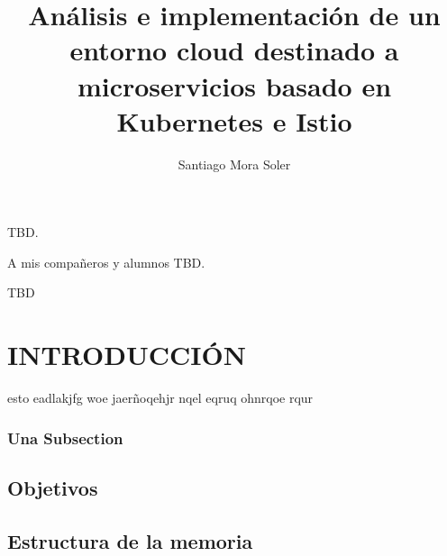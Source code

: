 \documentclass[spanish,twoside,12pt,a4paper]{book}
\title{Análisis e implementación de un entorno cloud destinado a microservicios basado en Kubernetes e Istio}
\author{Santiago Mora Soler}
\begin{document}
\renewcommand\tablename{Tabla}
\renewcommand\listtablename{ÍNDICE DE TABLAS}

\renewcommand\listfigurename{ÍNDICE DE FIGURAS}

\cosupervisor{}

\maketitle

\frontmatter %

\begin{resumen} %
TBD.
\end{resumen}

\begin{dedicatoria} %
A mis compañeros y alumnos TBD.
\end{dedicatoria}

\begin{agradece} %
 TBD
\end{agradece}


\tableofcontents

\clearpage
\listoffigures
{} 
\clearpage
\listoftables
{} 
\thispagestyle{empty}\cleardoublepage


\mainmatter %

\chapter{INTRODUCCIÓN}

esto eadlakjfg woe jaerñoqehjr nqel eqruq ohnrqoe rqur



\subsection{Una Subsection}


\section{Objetivos}



\section{Estructura de la memoria}
\end{document}
